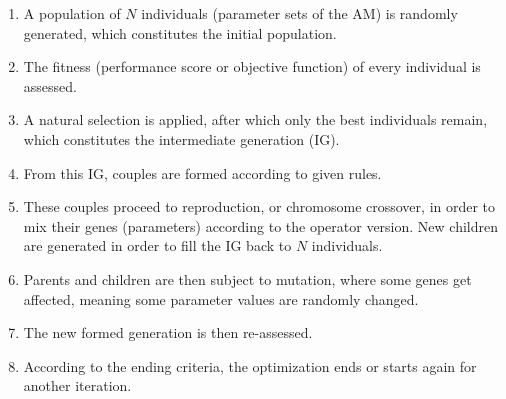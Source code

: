 \documentclass[twocol]{ametsoc}
\begin{document}
\begin{enumerate}
	\item A population of $N$ individuals (parameter sets of the AM) is randomly generated, which constitutes the initial population.
	\item The fitness (performance score or objective function) of every individual is assessed.
	\item A natural selection is applied, after which only the best individuals remain, which constitutes the intermediate generation (IG).
	\item From this IG, couples are formed according to given rules.
	\item These couples proceed to reproduction, or chromosome crossover, in order to mix their genes (parameters) according to the operator version. New children are generated in order to fill the IG back to $N$ individuals.
	\item Parents and children are then subject to mutation, where some genes get affected, meaning some parameter values are randomly changed.
	\item The new formed generation is then re-assessed.
	\item According to the ending criteria, the optimization ends or starts again for another iteration.
\end{enumerate}
\end{document}
